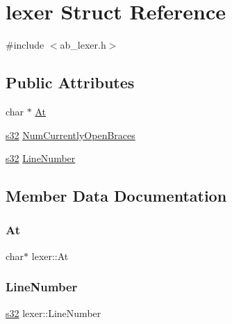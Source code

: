 \hypertarget{structlexer}{}\section{lexer Struct Reference}
\label{structlexer}


{\ttfamily \#include $<$ab\+\_\+lexer.\+h$>$}

\subsection*{Public Attributes}
\begin{DoxyCompactItemize}
\item 
char $\ast$ \hyperlink{structlexer_a3a775702427156530a8b1c1f426a904d}{At}
\item 
\hyperlink{ab__common_8h_ae9b1af5c037e57a98884758875d3a7c4}{s32} \hyperlink{structlexer_a467733563699eba46da6c518ae3923eb}{Num\+Currently\+Open\+Braces}
\item 
\hyperlink{ab__common_8h_ae9b1af5c037e57a98884758875d3a7c4}{s32} \hyperlink{structlexer_a252d45a538fbf3a3b5a22c294061651c}{Line\+Number}
\end{DoxyCompactItemize}


\subsection{Member Data Documentation}
\mbox{\label{structlexer_a3a775702427156530a8b1c1f426a904d}} 
\subsubsection{\texorpdfstring{At}{At}}
{\footnotesize\ttfamily char$\ast$ lexer\+::\+At}

\mbox{\label{structlexer_a252d45a538fbf3a3b5a22c294061651c}} 
\subsubsection{\texorpdfstring{Line\+Number}{LineNumber}}
{\footnotesize\ttfamily \hyperlink{ab__common_8h_ae9b1af5c037e57a98884758875d3a7c4}{s32} lexer\+::\+Line\+Number}

\mbox{\label{structlexer_a467733563699eba46da6c518ae3923eb}} 
